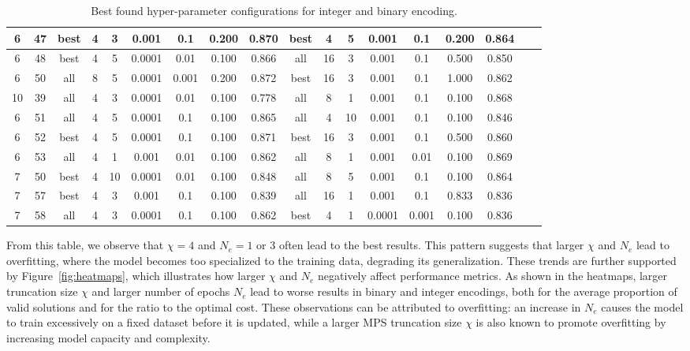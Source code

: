 \begin{table*}[!h]
\begin{tabular}{|c|c||c|c|c|c|c|c|c||c|c|c|c|c|c|c|c|c|}
6 & 47 & best & 4 & 3 & 0.001 & 0.1 & 0.200 & 0.870 &best & 4 & 5 & 0.001 & 0.1 & 0.200 & 0.864 \\ \hline
6 & 48 & best & 4 & 5 & 0.0001 & 0.01 & 0.100 & 0.866 &all & 16 & 3 & 0.001 & 0.1 & 0.500 & 0.850 \\ \hline
6 & 50 & all & 8 & 5 & 0.0001 & 0.001 & 0.200 & 0.872 &best & 16 & 3 & 0.001 & 0.1 & 1.000 & 0.862 \\ \hline
10 & 39 & all & 4 & 3 & 0.0001 & 0.01 & 0.100 & 0.778 &all & 8 & 1 & 0.001 & 0.1 & 0.100 & 0.868 \\ \hline
6 & 51 & all & 4 & 5 & 0.0001 & 0.1 & 0.100 & 0.865 &all & 4 & 10 & 0.001 & 0.1 & 0.100 & 0.846 \\ \hline
6 & 52 & best & 4 & 5 & 0.0001 & 0.1 & 0.100 & 0.871 &best & 16 & 3 & 0.001 & 0.1 & 0.500 & 0.860 \\ \hline
6 & 53 & all & 4 & 1 & 0.001 & 0.01 & 0.100 & 0.862 &all & 8 & 1 & 0.001 & 0.01 & 0.100 & 0.869 \\ \hline
7 & 50 & best & 4 & 10 & 0.0001 & 0.01 & 0.100 & 0.848 &all & 8 & 5 & 0.001 & 0.1 & 0.100 & 0.864 \\ \hline
7 & 57 & best & 4 & 3 & 0.001 & 0.1 & 0.100 & 0.839 &all & 16 & 1 & 0.001 & 0.1 & 0.833 & 0.836 \\ \hline
7 & 58 & all & 4 & 3 & 0.0001 & 0.1 & 0.100 & 0.862 &best & 4 & 1 & 0.0001 & 0.001 & 0.100 & 0.836 \\ \hline        
\end{tabular}
    \caption{Best found hyper-parameter configurations for integer and binary encoding.}
    \label{tab:best_parameters_all}
\end{table*}

From this table, we observe that $\chi=4$ and $N_e=1$ or $3$ often lead to the best results. This pattern suggests that larger $\chi$ and $N_e$ lead to overfitting, where the model becomes too specialized to the training data, degrading its generalization. These trends are further supported by Figure~\ref{fig:heatmaps}, which illustrates how larger $\chi$ and $N_e$ negatively affect performance metrics. As shown in the heatmaps, larger truncation size $\chi$ and larger number of epochs $N_e$ lead to worse results in binary and integer encodings, both for the average proportion of valid solutions and for the ratio to the optimal cost. These observations can be attributed to overfitting: an increase in $N_e$ causes the model to train excessively on a fixed dataset before it is updated, while a larger MPS truncation size $\chi$ is also known to promote overfitting by increasing model capacity and complexity.

